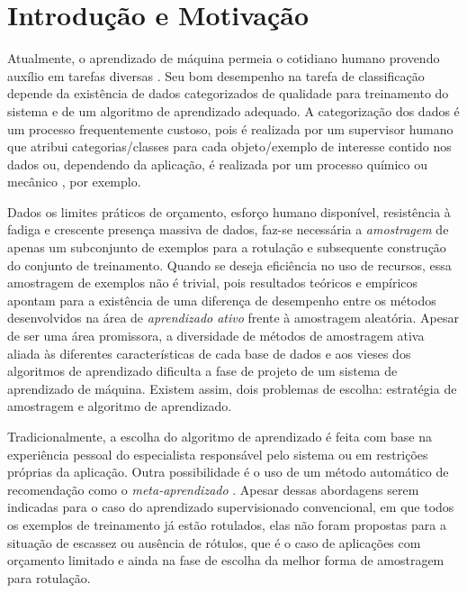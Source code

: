 \section{Introdução e Motivação}
Atualmente, o aprendizado de máquina permeia o cotidiano humano
provendo auxílio em tarefas diversas \citep{Bishop2006}.
Seu bom desempenho na tarefa de classificação depende da existência de dados
categorizados de qualidade para treinamento do sistema e de um algoritmo de
aprendizado adequado.
A categorização dos dados é um processo frequentemente custoso,
pois é realizada por um supervisor humano que atribui categorias/classes para cada
objeto/exemplo de interesse contido nos dados ou, dependendo da aplicação,
é realizada por um processo químico ou mecânico \citep{journals/etai/BryantMOKRK01},
por exemplo.

Dados os limites práticos de orçamento, esforço humano disponível, resistência à fadiga
e crescente presença massiva de dados, faz-se necessária a \textit{amostragem} de
apenas um subconjunto de exemplos para a rotulação e subsequente construção do
conjunto de treinamento.
Quando se deseja eficiência no uso de recursos, essa amostragem de exemplos não é trivial,
pois resultados teóricos e empíricos apontam para a existência de uma diferença de
desempenho entre os métodos desenvolvidos na área de \textit{aprendizado ativo}
\citep{series/synthesis/2012Settles} frente à amostragem aleatória.
Apesar de ser uma área promissora, a diversidade de métodos de amostragem
ativa aliada às diferentes características de cada base de dados e aos vieses dos algoritmos
de aprendizado dificulta a fase de projeto de um sistema de aprendizado de máquina.
Existem assim, dois problemas de escolha: estratégia de amostragem e algoritmo
de aprendizado.

Tradicionalmente, a escolha do algoritmo de aprendizado é feita com base na experiência
pessoal do especialista responsável pelo sistema ou em restrições próprias da aplicação.
Outra possibilidade é o uso de um método automático de recomendação como o
\textit{meta-aprendizado} \citep{books/daglib/0022052}.
Apesar dessas abordagens serem indicadas para o caso do aprendizado supervisionado
convencional, em que todos os exemplos de treinamento já estão rotulados,
elas não foram propostas para a situação de escassez ou ausência de rótulos, que é o caso
de aplicações com orçamento limitado e ainda na fase de escolha da melhor forma
de amostragem para rotulação.

